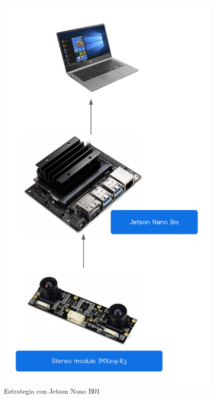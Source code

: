 \begin{figure}[H]
    \centering
    \includegraphics[scale=0.5]{Recursos/estrategia_jestson_nano.png}
    \caption{Estrategia con Jetson Nano B01}
    \label{estrategia_jetson}
\end{figure}
